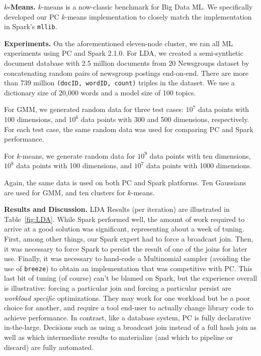 \vspace{5pt}
\noindent
\textbf{$k$-Means.} $k$-means is a now-classic
benchmark for Big Data ML.  We specifically developed our PC $k$-means implementation to closely match
the implementation in Spark's \texttt{mllib}.

\vspace{5pt}
\noindent
\textbf {Experiments.} On the aforementioned eleven-node cluster, 
we ran all ML experiments using PC and Spark 2.1.0.
For LDA,  we
created a semi-synthetic document database with 2.5 million documents from
20 Newsgroups dataset by concatenating random pairs of newsgroup postings
end-on-end. There are more than 739
million \texttt{(docID, wordID, count)} triples in the dataset.
We use a dictionary size
of 20,000 words and a model size of 100 topics. 

For GMM, we generated
random data for three test cases: $10^7$ data
points with 100 dimensions, and $10^6$ data points with 300 and 500
dimensions, respectively. For each test case, the same random data was used
for comparing PC and Spark performance. 

For $k$-means, we
generate random data for $10^9$ data
points with ten dimensions, $10^8$ data points with 100 dimensions,  and $10^7$
data points with 1000
dimensions. 



Again, the same data is used on both PC and
Spark platforms.
Ten Gaussians are used for GMM, and ten clusters for $k$-means.

\vspace{5pt}
\noindent
\textbf {Results and Discussion.} LDA Results (per iteration) are
illustrated in Table~\ref{fig:LDA}. While Spark performed well, the 
amount of work required to arrive at a good solution 
was significant, representing about a week of tuning.  First, among other things, our Spark expert had to force a 
broadcast join.  Then, it was necessary to force Spark to
persist the result of one of the joins for later use.  Finally, it was necessary to hand-code a 
Multinomial sampler (avoiding the use of \texttt{breeze}) to obtain an implementation that was competitive with PC.
This last bit of tuning (of course) can't be blamed on Spark, but the experience overall is illustrative: forcing 
a particular join and forcing a particular persist are \emph{workload specific} optimizations.  They may work for one
workload but be a poor choice for another, and require a tool end-user to actually change library code to achieve
performance.  In contrast, like a database system, PC is fully declarative in-the-large.
Decisions such as using a broadcast join instead of a full hash
join as well as which intermediate results to materialize (and which to pipeline or discard) are fully automated.


